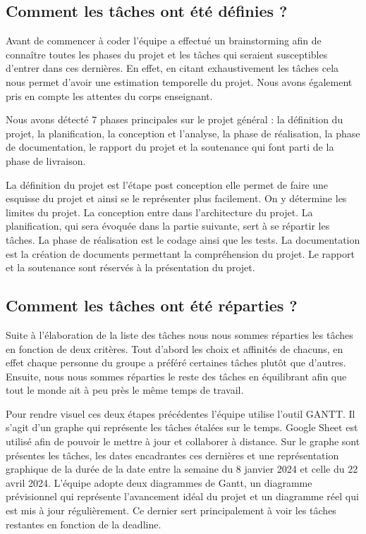 \documentclass[a4paper,12pt]{article}
\begin{document}
\subsection{Comment les tâches ont été définies ?}
Avant de commencer à coder l’équipe a effectué un brainstorming afin de connaître toutes les phases du projet et les tâches qui seraient susceptibles d’entrer dans ces dernières. 
En effet, en citant exhaustivement les tâches cela nous permet d’avoir une estimation temporelle du projet. 
Nous avons également pris en compte les attentes du corps enseignant.

Nous avons détecté 7 phases principales sur le projet général : la définition du projet, la planification, la conception et l'analyse, la phase de réalisation, la phase de documentation, le rapport du projet et la soutenance qui font parti de la phase de livraison.

La définition du projet est l’étape post conception elle permet de faire une esquisse du projet et ainsi se le représenter plus facilement. 
On y détermine les limites du projet. 
La conception entre dans l’architecture du projet. 
La planification, qui sera évoquée dans la partie suivante, sert à se répartir les tâches. La phase de réalisation est le codage ainsi que les tests. 
La documentation est la création de documents permettant la compréhension du projet. 
Le rapport et la soutenance sont réservés à la présentation du projet.

\subsection{Comment les tâches ont été réparties ?}
Suite à l’élaboration de la liste des tâches nous nous sommes réparties les tâches en fonction de deux critères. 
Tout d’abord les choix et affinités de chacuns, en effet chaque personne du groupe a préféré certaines tâches plutôt que d’autres. 
Ensuite, nous nous sommes réparties le reste des tâches en équilibrant afin que tout le monde ait à peu près le même temps de travail.

Pour rendre visuel ces deux étapes précédentes l’équipe utilise l'outil GANTT. 
Il s’agit d’un graphe qui représente les tâches étalées sur le temps. 
Google Sheet est utilisé afin de pouvoir le mettre à jour et collaborer à distance.
Sur le graphe sont présentes les tâches, les dates encadrantes ces dernières et une représentation graphique de la durée de la date entre la semaine du 8 janvier 2024 et celle du 22 avril 2024.
L’équipe adopte deux diagrammes de Gantt, un diagramme prévisionnel qui représente l’avancement idéal du projet et un diagramme réel qui est mis à jour régulièrement. 
Ce dernier sert principalement à voir les tâches restantes en fonction de la deadline.
\end{document}
